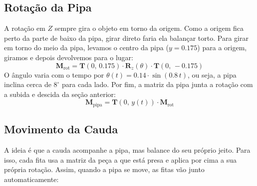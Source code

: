 \documentclass[11pt,a4paper]{article}
\begin{document}
\subsection{Rotação da Pipa}
A rotação em $Z$ sempre gira o objeto em torno da origem. Como a origem fica perto da parte de baixo da pipa, girar direto faria ela balançar torto. Para girar em torno do meio da pipa, levamos o centro da pipa ($y = 0.175$) para a origem, giramos e depois devolvemos para o lugar:
\begin{equation}
    \mathbf{M}_{\text{rot}} = \mathbf{T}(0,\, 0.175) \cdot \mathbf{R}_z(\theta) \cdot \mathbf{T}(0,\, -0.175)
\end{equation}
O ângulo varia com o tempo por $\theta(t) = 0.14 \cdot \sin(0.8\, t)$, ou seja, a pipa inclina cerca de $8^\circ$ para cada lado. Por fim, a matriz da pipa junta a rotação com a subida e descida da seção anterior:
\begin{equation}
    \mathbf{M}_{\text{pipa}} = \mathbf{T}(0,\, y(t)) \cdot \mathbf{M}_{\text{rot}}
\end{equation}

\subsection{Movimento da Cauda}
A ideia é que a cauda acompanhe a pipa, mas balance do seu próprio jeito. Para isso, cada fita usa a matriz da peça a que está presa e aplica por cima a sua própria rotação. Assim, quando a pipa se move, as fitas vão junto automaticamente:

\begin{center}
\end{center}
\end{document}

